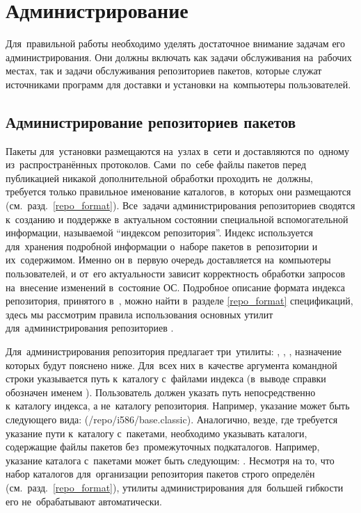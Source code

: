 
\section{Администрирование \ds}

Для~правильной работы \ds необходимо уделять достаточное внимание задачам его администрирования.
Они должны включать как задачи обслуживания \ds на~рабочих местах, так и задачи обслуживания репозиториев пакетов,
которые служат источниками программ для доставки и установки на~компьютеры пользователей.

\subsection{Администрирование репозиториев пакетов}

Пакеты для~установки размещаются на~узлах в~сети и доставляются по~одному из~распространённых протоколов.
Сами~по~себе файлы пакетов перед публикацией никакой дополнительной обработки проходить не~должны,
требуется только правильное именование каталогов, в~которых они размещаются (см.~разд.~\ref{repo_format}).
Все~задачи администрирования репозиториев сводятся к~созданию и поддержке в~актуальном состоянии специальной вспомогательной информации,
называемой ``индексом  репозитория''.
Индекс используется для~хранения подробной информации о~наборе пакетов в~репозитории и их~содержимом.
Именно он в~первую очередь доставляется  на~компьютеры пользователей,
и от~его актуальности зависит корректность обработки запросов на~внесение изменений в~состояние ОС.
Подробное описание формата индекса репозитория, принятого в~\ds, можно найти в~разделе \ref{repo_format} спецификаций,
здесь мы рассмотрим правила использования основных утилит для~администрирования репозиториев \ds.

Для~администрирования репозитория \ds  предлагает три~утилиты:
,
,
,
назначение которых будут пояснено ниже.
Для~всех них в~качестве аргумента командной строки указывается путь к~каталогу с~файлами индекса (в~выводе справки обозначен именем ).
Пользователь должен указать путь непосредственно к~каталогу индекса,
а не~каталогу репозитория. 
Например, указание может быть следующего вида: \PATH(/repo/i586/base.classic). 
Аналогично, везде, где требуется указание пути к~каталогу с~пакетами, необходимо указывать каталоги,
содержащие файлы пакетов без~промежуточных подкаталогов.
Например, указание каталога с~пакетами может быть следующим: .
Несмотря на то, что набор каталогов для~организации репозитория пакетов \ds строго определён (см.~разд.~\ref{repo_format}),
утилиты администрирования  для~большей гибкости его не~обрабатывают автоматически.


